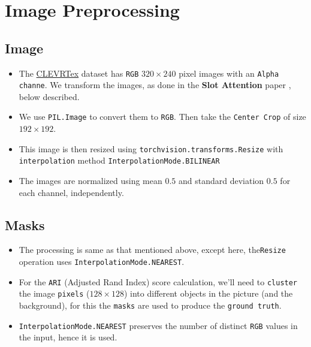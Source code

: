 \section{Image Preprocessing}

\subsection{Image}
\begin{itemize}
    \item The \href{https://www.robots.ox.ac.uk/~vgg/data/clevrtex/}{CLEVRTex} dataset has \verb|RGB| $320 \times 240$ pixel images with an \verb|Alpha channe|. We transform the images, as done in the \textbf{Slot Attention} paper \cite{slot_attention}, below described.
    \item  We use \verb|PIL.Image| to convert them to \verb|RGB|. Then take the \verb|Center Crop| of size $192 \times 192$.

    \item  This image is then resized using \verb|torchvision.transforms.Resize| with \verb|interpolation| method \verb|InterpolationMode.BILINEAR|

    \item The images are normalized using mean $0.5$ and standard deviation $0.5$ for each channel, independently.

\end{itemize}


\subsection{Masks}
\begin{itemize}
    \item The processing is same as that mentioned above, except here, the\verb|Resize| operation uses \verb|InterpolationMode.NEAREST|.
    
    \item For the \verb|ARI| (Adjusted Rand Index) score calculation, we'll need to \verb|cluster| the image \verb|pixels| ($128 \times 128$) into different objects in the picture (and the background), for this the \verb|masks| are used to produce the \verb|ground truth|.
    \item \verb|InterpolationMode.NEAREST| preserves the number of distinct \verb|RGB| values in the input, hence it is used.
\end{itemize}


